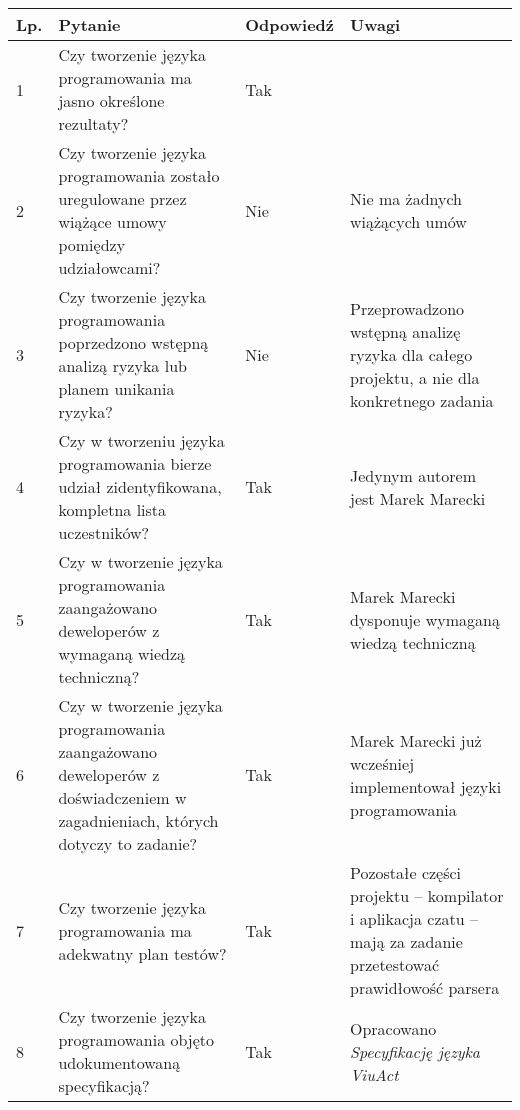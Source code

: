 \documentclass[11pt,oneside,a4paper,titlepage,onecolumn]{article}
\begin{document}
\begin{tabularx}{\textwidth}{|l|X|l|X|}
    \hline
    Lp. & Pytanie & Odpowiedź & Uwagi \\ \hline
    
    1 
    & Czy tworzenie języka programowania ma jasno określone 
    rezultaty?
    & Tak
    & 
    \\\hline
    
    2
	& Czy tworzenie języka programowania zostało uregulowane
	przez wiążące umowy pomiędzy udziałowcami?
	& Nie 
	& Nie ma żadnych wiążących umów
	\\\hline
	
	3
	& Czy tworzenie języka programowania poprzedzono wstępną analizą
	ryzyka lub planem unikania ryzyka?
	& Nie
	& Przeprowadzono wstępną analizę ryzyka dla całego projektu, a
	nie dla konkretnego zadania
	\\\hline
	
	4
	& Czy w tworzeniu języka programowania bierze udział 
	zidentyfikowana, kompletna lista uczestników?
	& Tak
	& Jedynym autorem jest Marek Marecki
	\\\hline
	
	5
	& Czy w tworzenie języka programowania zaangażowano deweloperów 
	z wymaganą wiedzą techniczną?
	& Tak
	& Marek Marecki dysponuje wymaganą wiedzą techniczną
	\\\hline
	
	6
	& Czy w tworzenie języka programowania zaangażowano deweloperów 
	z doświadczeniem w zagadnieniach, których dotyczy to zadanie?
	& Tak
	& Marek Marecki już wcześniej implementował języki programowania
	\\\hline
	
	7
	& Czy tworzenie języka programowania ma adekwatny plan testów?
	& Tak
	& Pozostałe części projektu -- kompilator i aplikacja czatu --
	mają za zadanie przetestować prawidłowość parsera
	\\\hline	
	
	8
	& Czy tworzenie języka programowania objęto udokumentowaną
	specyfikacją?
	& Tak
	& Opracowano \textit{Specyfikację języka ViuAct} 
	\\\hline
\end{tabularx}
\end{document}
